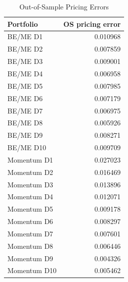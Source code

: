 \begin{table}[H]
  \centering
  \caption{Out-of-Sample Pricing Errors}
  \label{tab:2e-pricing-errors}
  \begin{tabular}{lr}
    \toprule
    Portfolio & OS pricing error \\
    \midrule
    BE/ME D1 & 0.010968 \\
    BE/ME D2 & 0.007859 \\
    BE/ME D3 & 0.009001 \\
    BE/ME D4 & 0.006958 \\
    BE/ME D5 & 0.007985 \\
    BE/ME D6 & 0.007179 \\
    BE/ME D7 & 0.006975 \\
    BE/ME D8 & 0.005926 \\
    BE/ME D9 & 0.008271 \\
    BE/ME D10 & 0.009709 \\
    Momentum D1 & 0.027023 \\
    Momentum D2 & 0.016469 \\
    Momentum D3 & 0.013896 \\
    Momentum D4 & 0.012071 \\
    Momentum D5 & 0.009178 \\
    Momentum D6 & 0.008297 \\
    Momentum D7 & 0.007601 \\
    Momentum D8 & 0.006446 \\
    Momentum D9 & 0.004326 \\
    Momentum D10 & 0.005462 \\
    \bottomrule
  \end{tabular}
\end{table}
